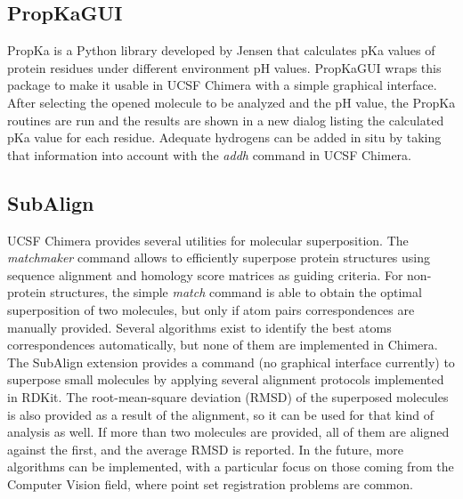 \subsection{PropKaGUI}
PropKa is a Python library developed by Jensen\cite{propka}  that calculates pKa values of protein residues under different environment pH values. PropKaGUI wraps this package to make it usable in UCSF Chimera with a simple graphical interface. After selecting the opened molecule to be analyzed and the pH value, the PropKa routines are run and the results are shown in a new dialog listing the calculated pKa value for each residue. Adequate hydrogens can be added in situ by taking that information into account with the \textit{addh} command in UCSF Chimera.

\subsection{SubAlign}
UCSF Chimera provides several utilities for molecular superposition. The \textit{matchmaker} command allows to efficiently superpose protein structures using sequence alignment and homology score matrices as guiding criteria. For non-protein structures, the simple \textit{match} command is able to obtain the optimal superposition of two molecules, but only if atom pairs correspondences are manually provided. Several algorithms exist to identify the best atoms correspondences automatically,\cite{cho2006flame,girones2001tgsa} but none of them are implemented in Chimera. The SubAlign extension provides a command (no graphical interface currently) to superpose small molecules by applying several alignment protocols implemented in RDKit.\cite{rdkit} The root-mean-square deviation (RMSD) of the superposed molecules is also provided as a result of the alignment, so it can be used for that kind of analysis as well. If more than two molecules are provided, all of them are aligned against the first, and the average RMSD is reported. In the future, more algorithms can be implemented, with a particular focus on those coming from the Computer Vision field, where point set registration problems are common.

